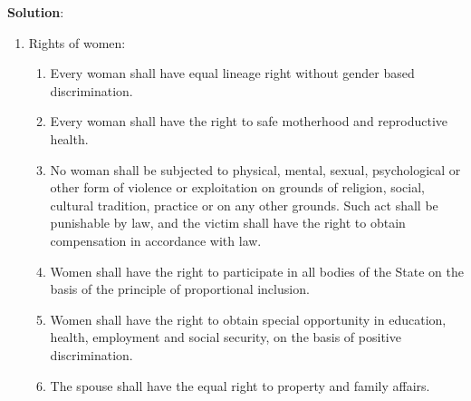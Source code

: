\documentclass[
]{book}
\newenvironment{solution}{ {\bfseries Solution}:}{}
\begin{document}
\begin{questions}
\begin{solution}
\begin{enumerate}
\item Rights of women:
\begin{enumerate}
\item Every woman shall have equal lineage right without gender based discrimination.
\item Every woman shall have the right to safe motherhood and reproductive health.
\item No woman shall be subjected to physical, mental, sexual, psychological or other form of violence or exploitation on grounds of religion, social, cultural tradition, practice or on any other grounds. Such act shall be punishable by law, and the victim shall have the right to obtain compensation in accordance with law.
\item Women shall have the right to participate in all bodies of the State on the basis of the principle of proportional inclusion.
\item Women shall have the right to obtain special opportunity in education, health, employment and social security, on the basis of positive discrimination.
\item The spouse shall have the equal right to property and family affairs.
\end{enumerate}


\end{enumerate}
\end{solution}
\end{questions}
\end{document}
